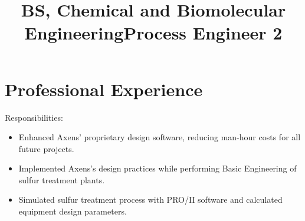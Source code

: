 \documentclass[12pt]{res} %
\begin{document}
\begin{resume}
            \title{\bfseries BS, Chemical and Biomolecular Engineering}
            \begin{position}
                \vspace{-14pt}
            \end{position}
            \vspace{-12pt}

        \section{Professional Experience}
        
            \title{\bfseries Process Engineer 2}
            \begin{position}
                Responsibilities:
                \begin{itemize}
                \setlength{\itemindent}{-0.50in}
                \itemsep0em
                \item Enhanced Axens' proprietary design software, reducing man-hour costs for all future projects.
                \item Implemented Axens's design practices while performing Basic Engineering of sulfur treatment plants.
                \item Simulated sulfur treatment process with PRO/II software and calculated equipment design parameters.
                \end{itemize}
            \end{position}
            \vspace{-10pt}


\end{resume}
\end{document}
